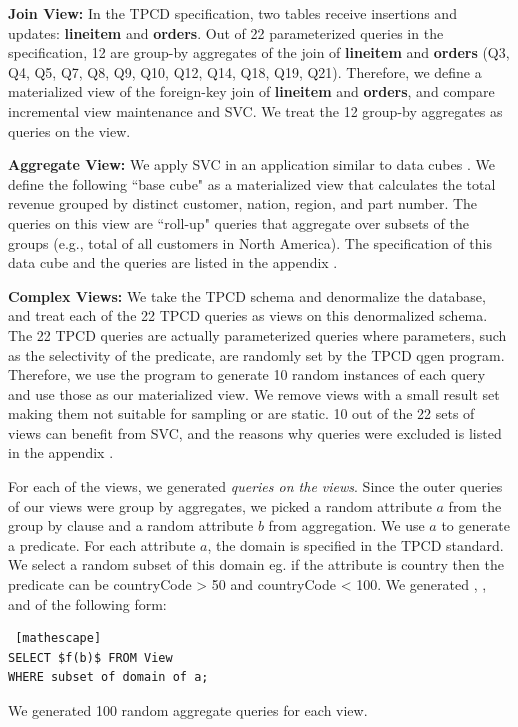 \textbf{Join View: } In the TPCD specification, two tables receive insertions and updates: \textbf{lineitem} and \textbf{orders}.
Out of 22 parameterized queries in the specification, 12 are group-by aggregates of the join of \textbf{lineitem} and \textbf{orders} (Q3, Q4, Q5, Q7, Q8, Q9, Q10, Q12, Q14, Q18, Q19, Q21).
Therefore, we define a materialized view of the foreign-key join of \textbf{lineitem} and \textbf{orders}, and compare incremental view maintenance and SVC.
We treat the 12 group-by aggregates as queries on the view.

\textbf{Aggregate View: } We apply SVC in an application similar to data cubes \cite{gray1997data}.
We define the following ``base cube" as a materialized view that calculates the total revenue 
grouped by distinct customer, nation, region, and part number.
The queries on this view are ``roll-up" queries that aggregate over 
subsets of the groups (e.g., total of all customers in North America).
The specification of this data cube and the queries are listed in the appendix .

\textbf{Complex Views:} We take the TPCD schema and denormalize the database, and treat each of the 22 
TPCD queries as views on this denormalized schema. 
The 22 TPCD queries are actually parameterized queries where parameters, such as the selectivity of the predicate, are randomly set by the TPCD \textsf{qgen} program.
Therefore, we use the program to generate 10 random instances of each query and use those as our materialized view.
We remove views with a small result set making them not suitable for sampling or are static.
10 out of the 22 sets of views can benefit from SVC, and the reasons why queries were excluded is listed in the appendix .

For each of the views, we generated \emph{queries on the views}.
Since the outer queries of our views were group by aggregates, we picked a random attribute $a$ from the group by clause and a random attribute $b$ from aggregation.
We use $a$ to generate a predicate.
For each attribute $a$, the domain is specified in the TPCD standard.
We select a random subset of this domain eg. if the attribute is country then the predicate can be \textsf{countryCode} > 50 and \textsf{countryCode} < 100.
We generated \sumfunc, \avgfunc, and \countfunc of the following form: 
\begin{lstlisting} [mathescape]
SELECT $f(b)$ FROM View 
WHERE subset of domain of a;
\end{lstlisting}
We generated 100 random aggregate queries for each view.

